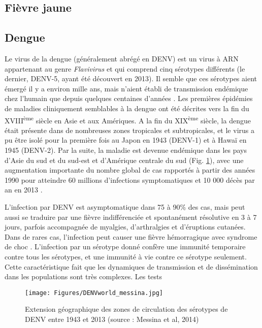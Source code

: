 \subsection{Fièvre jaune}



\subsection{Dengue}

Le virus de la dengue (généralement abrégé en DENV) est un virus à ARN appartenant au genre {\em Flavivirus} et qui comprend cinq sérotypes différents (le dernier, DENV-5, ayant été découvert en 2013).
Il semble que ces sérotypes aient émergé il y a environ mille ans, mais n'aient établi de transmission endémique chez l'humain que depuis quelques centaines d'années \cite{holmes2003origin}.
Les premières épidémies de maladies cliniquement semblables à la dengue ont été décrites vers la fin du XVIII\textsuperscript{ème} siècle en Asie et aux Amériques.
A la fin du XIX\textsuperscript{ème} siècle, la dengue était présente dans de nombreuses zones tropicales et subtropicales, et le virus a pu être isolé pour la première fois au Japon en 1943 (DENV-1) et à Hawaï en 1945 (DENV-2).
Par la suite, la maladie est devenue endémique dans les pays d'Asie du sud et du sud-est et d'Amérique centrale du sud (Fig. \ref{fig:denvworld}), avec une augmentation importante du nombre global de cas rapportés à partir des années 1990 pour atteindre 60 millions d'infections symptomatiques et 10 000 décès par an en 2013 \cite{messina2014global,stanaway2016global}.

L'infection par DENV est asymptomatique dans 75 à 90\% des cas, mais peut aussi se traduire par une fièvre indifférenciée et spontanément résolutive en 3 à 7 jours, parfois accompagnée de myalgies, d'arthralgies et d'éruptions cutanées.
Dans de rares cas, l'infection peut causer une fièvre hémorragique avec syndrome de choc \cite{simmons2012dengue}.
L'infection par un sérotype donné confère une immunité temporaire contre tous les sérotypes, et une immunité à vie contre ce sérotype seulement.
Cette caractéristique fait que les dynamiques de transmission et de dissémination dans les populations sont très complexes.
Les tests 

\begin{figure}[t]
	\centering
	\texttt{[image: Figures/DENVworld\_messina.jpg]}
	\caption{Extension géographique des zones de circulation des sérotypes de DENV entre 1943 et 2013 (source : Messina et al, 2014)}
	\label{fig:denvworld}
\end{figure}




